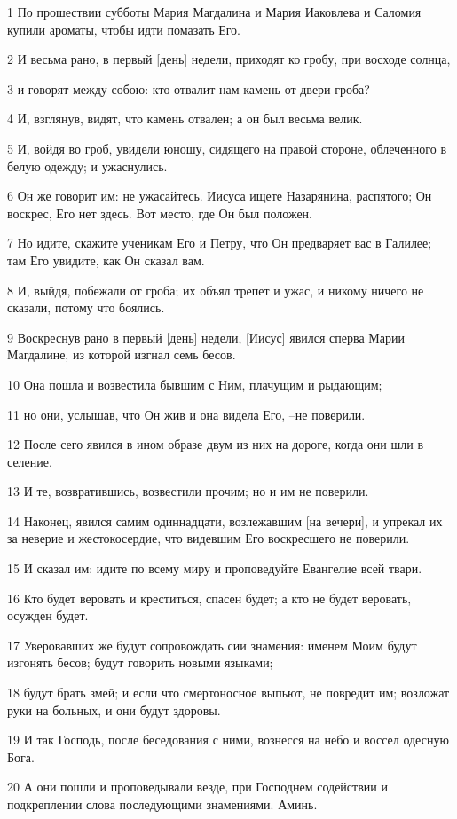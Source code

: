 \par 1 По прошествии субботы Мария Магдалина и Мария Иаковлева и Саломия купили ароматы, чтобы идти помазать Его.
\par 2 И весьма рано, в первый [день] недели, приходят ко гробу, при восходе солнца,
\par 3 и говорят между собою: кто отвалит нам камень от двери гроба?
\par 4 И, взглянув, видят, что камень отвален; а он был весьма велик.
\par 5 И, войдя во гроб, увидели юношу, сидящего на правой стороне, облеченного в белую одежду; и ужаснулись.
\par 6 Он же говорит им: не ужасайтесь. Иисуса ищете Назарянина, распятого; Он воскрес, Его нет здесь. Вот место, где Он был положен.
\par 7 Но идите, скажите ученикам Его и Петру, что Он предваряет вас в Галилее; там Его увидите, как Он сказал вам.
\par 8 И, выйдя, побежали от гроба; их объял трепет и ужас, и никому ничего не сказали, потому что боялись.
\par 9 Воскреснув рано в первый [день] недели, [Иисус] явился сперва Марии Магдалине, из которой изгнал семь бесов.
\par 10 Она пошла и возвестила бывшим с Ним, плачущим и рыдающим;
\par 11 но они, услышав, что Он жив и она видела Его, --не поверили.
\par 12 После сего явился в ином образе двум из них на дороге, когда они шли в селение.
\par 13 И те, возвратившись, возвестили прочим; но и им не поверили.
\par 14 Наконец, явился самим одиннадцати, возлежавшим [на вечери], и упрекал их за неверие и жестокосердие, что видевшим Его воскресшего не поверили.
\par 15 И сказал им: идите по всему миру и проповедуйте Евангелие всей твари.
\par 16 Кто будет веровать и креститься, спасен будет; а кто не будет веровать, осужден будет.
\par 17 Уверовавших же будут сопровождать сии знамения: именем Моим будут изгонять бесов; будут говорить новыми языками;
\par 18 будут брать змей; и если что смертоносное выпьют, не повредит им; возложат руки на больных, и они будут здоровы.
\par 19 И так Господь, после беседования с ними, вознесся на небо и воссел одесную Бога.
\par 20 А они пошли и проповедывали везде, при Господнем содействии и подкреплении слова последующими знамениями. Аминь.



